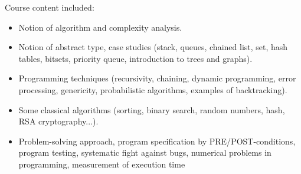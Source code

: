 Course content included:
\begin{itemize}
    \item Notion of algorithm and complexity analysis.
    \item Notion of abstract type, case studies (stack, queues, chained list, set, hash tables, bitsets, priority queue, introduction to trees and graphs).
    \item Programming techniques (recursivity, chaining, dynamic programming, error processing, genericity, probabilistic algorithms, examples of backtracking).
    \item Some classical algorithms (sorting, binary search, random numbers, hash, RSA cryptography...).
    \item Problem-solving approach, program specification by PRE/POST-conditions, program testing, systematic fight against bugs, numerical problems in programming, measurement of execution time
\end{itemize}